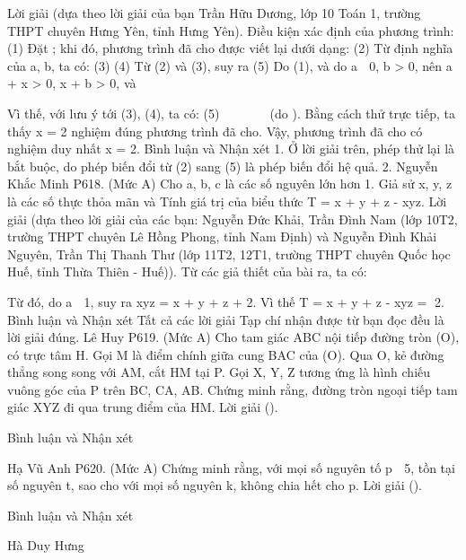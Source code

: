 \begin{multicols}{2}
	Lời giải (dựa theo lời giải của bạn Trần Hữu Dương, lớp 10 Toán 1, trường THPT chuyên Hưng Yên, tỉnh Hưng Yên).
	Điều kiện xác định của phương trình:                                                                                        (1)
	Đặt    ; khi đó, phương trình đã cho được viết lại dưới dạng:
	(2)
	Từ định nghĩa của a, b, ta có:
	(3)
	(4)
	Từ (2) và (3), suy ra
	(5)
	Do (1), và do a  0, b > 0, nên a + x > 0, x + b > 0, và
	
	Vì thế, với lưu ý tới (3), (4), ta có:
	(5)   
	  
	  
	     
	    (do  ).
	Bằng cách thử trực tiếp, ta thấy x = 2 nghiệm đúng phương trình đã cho.
	Vậy, phương trình đã cho có nghiệm duy nhất x = 2.
	Bình luận và Nhận xét
	1. Ở lời giải trên, phép thử lại là bắt buộc, do phép biến đổi từ (2) sang (5) là phép biến đổi hệ quả.
	2. 
	Nguyễn Khắc Minh
	P618. (Mức A) Cho a, b, c là các số nguyên lớn hơn 1. Giả sử x, y, z là các số thực thỏa mãn     và   Tính giá trị của biểu thức
	T = x + y + z - xyz.
	Lời giải (dựa theo lời giải của các bạn: Nguyễn Đức Khải, Trần Đình Nam (lớp 10T2, trường THPT chuyên Lê Hồng Phong, tỉnh Nam Định) và Nguyễn Đình Khải Nguyên, Trần Thị Thanh Thư (lớp 11T2, 12T1, trường THPT chuyên Quốc học Huế, tỉnh Thừa Thiên - Huế)).
	Từ các giả thiết của bài ra, ta có:
	
	Từ đó, do a  1, suy ra
	xyz = x + y + z + 2.
	Vì thế
	T = x + y + z - xyz = 2.
	Bình luận và Nhận xét
	Tất cả các lời giải Tạp chí nhận được từ bạn đọc đều là lời giải đúng.
	Lê Huy
	P619. (Mức A) Cho tam giác ABC nội tiếp đường tròn (O), có trực tâm H. Gọi M là điểm chính giữa cung BAC của (O). Qua O, kẻ đường thẳng song song với AM, cắt HM tại P. Gọi X, Y, Z tương ứng là hình chiếu vuông góc của P trên BC, CA, AB. Chứng minh rằng, đường tròn ngoại tiếp tam giác XYZ đi qua trung điểm của HM.
	Lời giải ().
	
	Bình luận và Nhận xét
	
	Hạ Vũ Anh
	P620. (Mức A) Chứng minh rằng, với mọi số nguyên tố p  5, tồn tại số nguyên t, sao cho với mọi số nguyên k,   không chia hết cho p.
	Lời giải ().
	
	Bình luận và Nhận xét
	
	
	Hà Duy Hưng
	
\end{multicols}